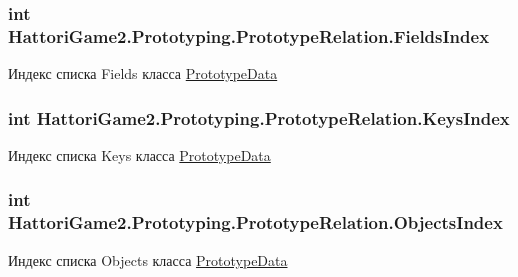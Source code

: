 \subsubsection[{Fields\+Index}]{\setlength{\rightskip}{0pt plus 5cm}int Hattori\+Game2.\+Prototyping.\+Prototype\+Relation.\+Fields\+Index}\label{struct_hattori_game2_1_1_prototyping_1_1_prototype_relation_a88f609574124005e5fc15ce6f1e370d7_a88f609574124005e5fc15ce6f1e370d7}


Индекс списка {\ttfamily Fields} класса \hyperlink{class_hattori_game2_1_1_prototyping_1_1_prototype_data}{Prototype\+Data} 

\hypertarget{struct_hattori_game2_1_1_prototyping_1_1_prototype_relation_a27933617bc39d11099af269e754f0411_a27933617bc39d11099af269e754f0411}{}
\subsubsection[{Keys\+Index}]{\setlength{\rightskip}{0pt plus 5cm}int Hattori\+Game2.\+Prototyping.\+Prototype\+Relation.\+Keys\+Index}\label{struct_hattori_game2_1_1_prototyping_1_1_prototype_relation_a27933617bc39d11099af269e754f0411_a27933617bc39d11099af269e754f0411}


Индекс списка {\ttfamily Keys} класса \hyperlink{class_hattori_game2_1_1_prototyping_1_1_prototype_data}{Prototype\+Data} 

\hypertarget{struct_hattori_game2_1_1_prototyping_1_1_prototype_relation_a7f0eab82b565c07fe25369f2257da5e7_a7f0eab82b565c07fe25369f2257da5e7}{}
\subsubsection[{Objects\+Index}]{\setlength{\rightskip}{0pt plus 5cm}int Hattori\+Game2.\+Prototyping.\+Prototype\+Relation.\+Objects\+Index}\label{struct_hattori_game2_1_1_prototyping_1_1_prototype_relation_a7f0eab82b565c07fe25369f2257da5e7_a7f0eab82b565c07fe25369f2257da5e7}


Индекс списка {\ttfamily Objects} класса \hyperlink{class_hattori_game2_1_1_prototyping_1_1_prototype_data}{Prototype\+Data} 

